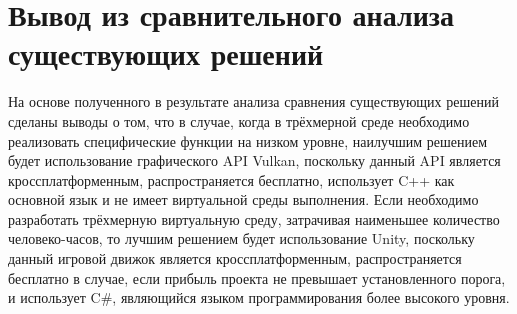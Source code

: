\section{Вывод из сравнительного анализа существующих решений}
На основе полученного в результате анализа сравнения существующих решений сделаны выводы о том, что в случае, когда в трёхмерной среде необходимо реализовать специфические функции на низком уровне, наилучшим решением будет использование графического API Vulkan, поскольку данный API является кроссплатформенным, распространяется бесплатно, использует C++ как основной язык и не имеет виртуальной среды выполнения. Если необходимо разработать трёхмерную виртуальную среду, затрачивая наименьшее количество человеко-часов, то лучшим решением будет использование Unity, поскольку данный игровой движок является кроссплатформенным, распространяется бесплатно в случае, если прибыль проекта не превышает установленного порога, и использует C\#, являющийся языком программирования более высокого уровня.